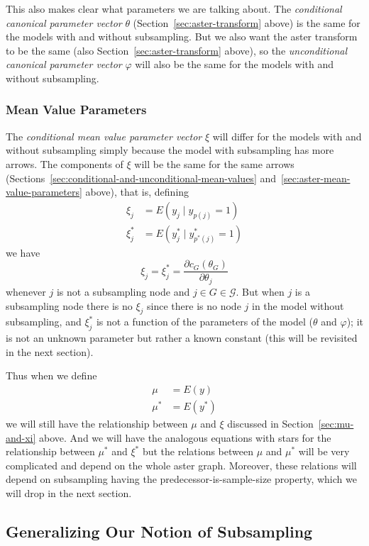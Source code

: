 This also makes clear what parameters we are talking about.
The \emph{conditional canonical parameter vector} $\theta$
(Section~\ref{sec:aster-transform} above)
is the same for the models with and without subsampling.
But we also want the aster transform to be the same
(also Section~\ref{sec:aster-transform} above), so
the \emph{unconditional canonical parameter vector} $\varphi$ will also be
the same for the models with and without subsampling.

\subsubsection{Mean Value Parameters}

The \emph{conditional mean value parameter vector} $\xi$ will differ
for the models with and without subsampling simply because the model
with subsampling has more arrows.  The components of $\xi$ will be the
same for the same arrows
(Sections~\ref{sec:conditional-and-unconditional-mean-values}
and~\ref{sec:aster-mean-value-parameters} above), that is, defining
\begin{align*}
   \xi_j & = E(y_j \mid y_{p(j)} = 1)
   \\
   \xi^*_j & = E(y_j^* \mid y^*_{p^*(j)} = 1)
\end{align*}
we have
$$
   \xi_j = \xi^*_j = \frac{\partial c_G(\theta_G)}{\partial \theta_j}
$$
whenever $j$ is not a subsampling node and $j \in G \in \mathcal{G}$.
But when $j$ is a subsampling node there is no $\xi_j$ since there is
no node $j$ in the model without subsampling, and $\xi^*_j$ is not a function
of the parameters of the model ($\theta$ and $\varphi$); it is not an unknown
parameter but rather a known constant (this will be revisited in the
next section).

Thus when we define
\begin{align*}
   \mu & = E(y)
   \\
   \mu^* & = E(y^*)
\end{align*}
we will still have the relationship between $\mu$ and $\xi$ discussed
in Section~\ref{sec:mu-and-xi} above.
And we will have the analogous equations with stars for the relationship
between $\mu^*$ and $\xi^*$ but the relations between $\mu$ and $\mu^*$
will be very complicated and depend on the whole aster graph.
Moreover, these relations will depend on subsampling having the
predecessor-is-sample-size property, which we will drop in the next section.

\subsection{Generalizing Our Notion of Subsampling} \label{sec:generalize}

